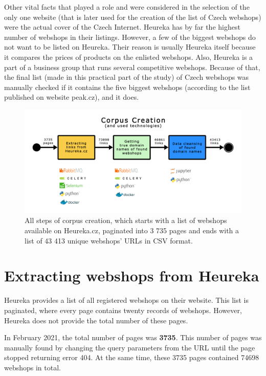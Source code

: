 Other vital facts that played a role and were considered in the selection of the only one website (that is later used for the creation of the list of Czech webshops) were the actual cover of the Czech Internet. Heureka has by far the highest number of webshops in their listings\cite{srovnavace-shoptet}. However, a few of the biggest webshops do not want to be listed on Heureka. Their reason is usually Heureka itself because it compares the prices of products on the enlisted webshops. Also, Heureka is a part of a business group that runs several competitive webshops. Because of that, the final list (made in this practical part of the study) of Czech webshops was manually checked if it contains the five biggest webshops (according to the list published on website peak.cz\cite{peak-eshopy}), and it does.

\begin{figure}[ht]
    \centering
    \includegraphics[width=1\linewidth]{media/corpus_creation.png}
    \caption{All steps of corpus creation, which starts with a list of webshops available on Heureka.cz, paginated into 3 735 pages and ends with a list of 43 413 unique webshops' URLs in CSV format.}
    \label{fig:corpus_creation}
\end{figure}

\section{Extracting webshops from Heureka}

Heureka provides a list of all registered webshops on their website. This list is paginated, where every page contains twenty records of webshops. However, Heureka does not provide the total number of these pages. 

In February 2021, the total number of pages was \textbf{3735}. This number of pages was manually found by changing the query parameters from the URL until the page stopped returning error 404. At the same time, these 3735 pages contained 74698 webshops in total. 

